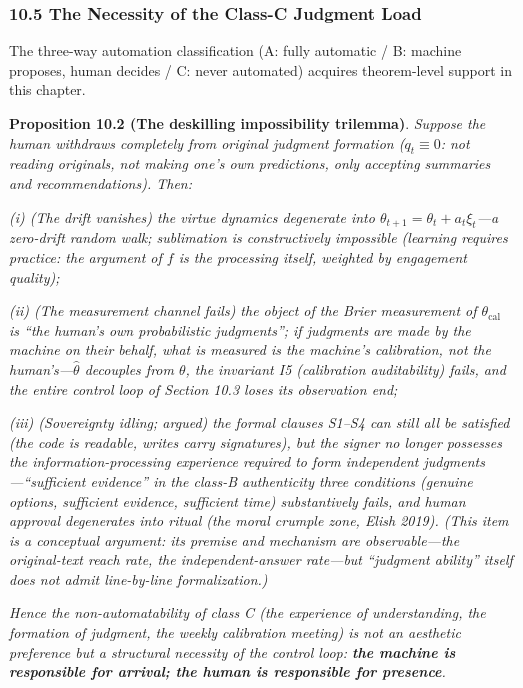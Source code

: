 \documentclass[
  11pt]{article}
\begin{document}
\subsubsection{10.5 The Necessity of the Class-C Judgment
Load}\label{the-necessity-of-the-class-c-judgment-load}

The three-way automation classification (A: fully automatic / B: machine
proposes, human decides / C: never automated) acquires theorem-level
support in this chapter.

\textbf{Proposition 10.2 (The deskilling impossibility trilemma)}.
\emph{Suppose the human withdraws completely from original judgment
formation (\(q_t \equiv 0\): not reading originals, not making one's own
predictions, only accepting summaries and recommendations). Then:}

\emph{(i) (The drift vanishes) the virtue dynamics degenerate into
\(\theta_{t+1} = \theta_t + a_t\xi_t\)---a zero-drift random walk;
sublimation is constructively impossible (learning requires practice:
the argument of \(f\) is the processing itself, weighted by engagement
quality);}

\emph{(ii) (The measurement channel fails) the object of the Brier
measurement of \(\theta_{\mathrm{cal}}\) is ``the human's own
probabilistic judgments''; if judgments are made by the machine on their
behalf, what is measured is the machine's calibration, not the
human's---\(\hat\theta\) decouples from \(\theta\), the invariant I5
(calibration auditability) fails, and the entire control loop of Section
10.3 loses its observation end;}

\emph{(iii) (Sovereignty idling; argued) the formal clauses S1--S4 can
still all be satisfied (the code is readable, writes carry signatures),
but the signer no longer possesses the information-processing experience
required to form independent judgments---``sufficient evidence'' in the
class-B authenticity three conditions (genuine options, sufficient
evidence, sufficient time) substantively fails, and human approval
degenerates into ritual (the moral crumple zone, Elish 2019). (This item
is a conceptual argument: its premise and mechanism are observable---the
original-text reach rate, the independent-answer rate---but ``judgment
ability'' itself does not admit line-by-line formalization.)}

\emph{Hence the non-automatability of class C (the experience of
understanding, the formation of judgment, the weekly calibration
meeting) is not an aesthetic preference but a structural necessity of
the control loop: \textbf{the machine is responsible for arrival; the
human is responsible for presence}.}
\end{document}
